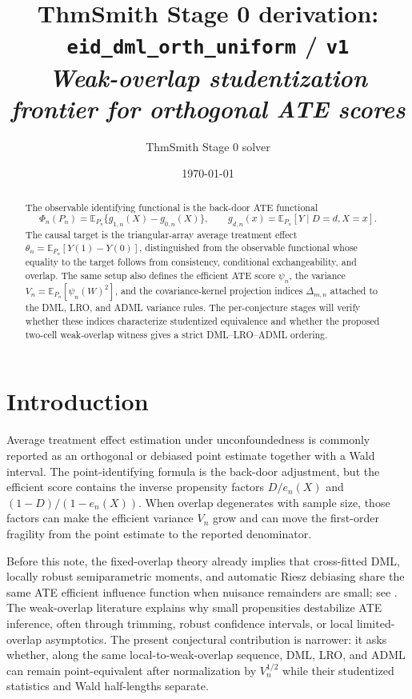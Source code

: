 \documentclass[11pt]{article}
\title{ThmSmith Stage 0 derivation: \texttt{eid\_dml\_orth\_uniform} / \texttt{v1}%
  \\ \large\textit{Weak-overlap studentization frontier for orthogonal ATE scores}}
\author{ThmSmith Stage 0 solver}
\date{\today}
\newcommand{\E}{\mathbb{E}}
\theoremstyle{definition}
\theoremstyle{plain}
\theoremstyle{remark}
\begin{document}
\maketitle


\begin{abstract}
The observable identifying functional is the back-door ATE functional
\[
  \Phi_n(P_n)=\E_{P_n}\{g_{1,n}(X)-g_{0,n}(X)\},
  \qquad
  g_{d,n}(x)=\E_{P_n}[Y\mid D=d,X=x].
\]
The causal target is the triangular-array average treatment effect
\(\theta_n=\E_{P_n}[Y(1)-Y(0)]\), distinguished from the observable functional
whose equality to the target follows from consistency, conditional
exchangeability, and overlap.  The same setup also defines the efficient ATE
score \(\psi_n\), the variance \(V_n=\E_{P_n}[\psi_n(W)^2]\), and the
covariance-kernel projection indices \(\Delta_{m,n}\) attached to the DML,
LRO, and ADML variance rules.  The per-conjecture stages will verify whether
these indices characterize studentized equivalence and whether the proposed
two-cell weak-overlap witness gives a strict DML--LRO--ADML ordering.
\end{abstract}

\section{Introduction}
Average treatment effect estimation under unconfoundedness is commonly
reported as an orthogonal or debiased point estimate together with a Wald
interval.  The point-identifying formula is the back-door adjustment, but the
efficient score contains the inverse propensity factors \(D/e_n(X)\) and
\((1-D)/(1-e_n(X))\).  When overlap degenerates with sample size, those factors
can make the efficient variance \(V_n\) grow and can move the first-order
fragility from the point estimate to the reported denominator.

Before this note, the fixed-overlap theory already implies that cross-fitted
DML, locally robust semiparametric moments, and automatic Riesz debiasing share
the same ATE efficient influence function when nuisance remainders are small;
see \cite{ChernozhukovEtAl2018DML,ChernozhukovEscancianoIchimuraNeweyRobins2022LRO,ChernozhukovNeweySingh2022ADML}.
The weak-overlap literature explains why small propensities destabilize ATE
inference, often through trimming, robust confidence intervals, or local
limited-overlap asymptotics.  The present conjectural contribution is narrower:
it asks whether, along the same local-to-weak-overlap sequence, DML, LRO, and
ADML can remain point-equivalent after normalization by \(V_n^{1/2}\) while
their studentized statistics and Wald half-lengths separate.
\end{document}
